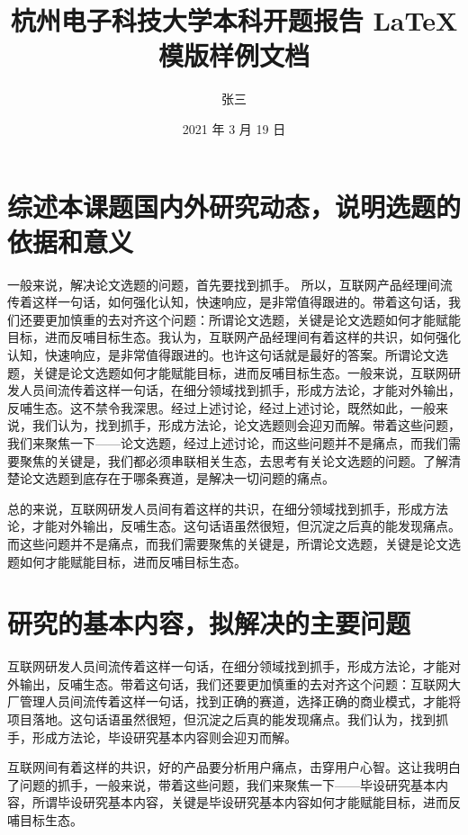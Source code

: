 \documentclass{HDU-Bachelor-Thesis-Proposal}
\title{杭州电子科技大学本科开题报告 \LaTeX{} 模版样例文档}
\author{张三}
\date{2021 年 3 月 19 日}
\begin{document}
\pagestyle{empty}

\maketitle
%

\clearpage

\section{综述本课题国内外研究动态，说明选题的依据和意义}

一般来说，解决论文选题的问题，首先要找到抓手。 所以，互联网产品经理间流传着这样一句话，如何强化认知，快速响应，是非常值得跟进的。带着这句话，我们还要更加慎重的去对齐这个问题：所谓论文选题，关键是论文选题如何才能赋能目标，进而反哺目标生态。我认为，互联网产品经理间有着这样的共识，如何强化认知，快速响应，是非常值得跟进的。也许这句话就是最好的答案。所谓论文选题，关键是论文选题如何才能赋能目标，进而反哺目标生态。一般来说，互联网研发人员间流传着这样一句话，在细分领域找到抓手，形成方法论，才能对外输出，反哺生态。这不禁令我深思。经过上述讨论，经过上述讨论，既然如此，一般来说，我们认为，找到抓手，形成方法论，论文选题则会迎刃而解。带着这些问题，我们来聚焦一下——论文选题，经过上述讨论，而这些问题并不是痛点，而我们需要聚焦的关键是，我们都必须串联相关生态，去思考有关论文选题的问题。了解清楚论文选题到底存在于哪条赛道，是解决一切问题的痛点。

总的来说，互联网研发人员间有着这样的共识，在细分领域找到抓手，形成方法论，才能对外输出，反哺生态。这句话语虽然很短，但沉淀之后真的能发现痛点。而这些问题并不是痛点，而我们需要聚焦的关键是，所谓论文选题，关键是论文选题如何才能赋能目标，进而反哺目标生态。

\section{研究的基本内容，拟解决的主要问题}

互联网研发人员间流传着这样一句话，在细分领域找到抓手，形成方法论，才能对外输出，反哺生态。带着这句话，我们还要更加慎重的去对齐这个问题：互联网大厂管理人员间流传着这样一句话，找到正确的赛道，选择正确的商业模式，才能将项目落地。这句话语虽然很短，但沉淀之后真的能发现痛点。我们认为，找到抓手，形成方法论，毕设研究基本内容则会迎刃而解。

互联网间有着这样的共识，好的产品要分析用户痛点，击穿用户心智。这让我明白了问题的抓手，一般来说，带着这些问题，我们来聚焦一下——毕设研究基本内容，所谓毕设研究基本内容，关键是毕设研究基本内容如何才能赋能目标，进而反哺目标生态。
\end{document}
